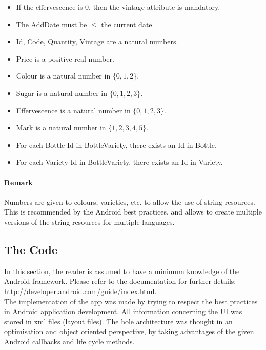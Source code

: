 \begin{itemize}
	\item If the effervescence is 0, then the vintage attribute is mandatory.
	\item The AddDate must be $\leq$ the current date.
	\item Id, Code, Quantity, Vintage are a natural numbers.
	\item Price is a positive real number.
	\item Colour is a natural number in $\{ 0, 1, 2\}$.
	\item Sugar is a natural number in $\{0, 1, 2, 3\}$.
	\item Effervescence is a natural number in $\{0, 1, 2, 3\}$.
	\item Mark is a natural number in $\{1, 2, 3, 4, 5\}$.
	\item For each Bottle Id in BottleVariety, there exists an Id in Bottle.
	\item For each Variety Id in BottleVariety, there exists an Id in Variety.
\end{itemize}

\paragraph{Remark}
Numbers are given to colours, varieties, etc. to allow the use of string resources. This is recommended by the Android best practices, and allows to create multiple versions of the string resources for multiple languages.

\subsection{The Code}

In this section, the reader is assumed to have a minimum knowledge of the Android framework. Please refer to the documentation for further details: \url{http://developer.android.com/guide/index.html}.\\

The implementation of the app was made by trying to respect the best practices in Android application development. All information concerning the UI was stored in xml files (layout files). The hole architecture was thought in an optimisation and object oriented perspective, by taking advantages of the given Android callbacks and life cycle methods.\\

